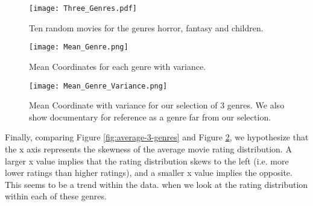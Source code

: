 \begin{figure}[hptb]
\centering
\texttt{[image: Three\_Genres.pdf]}
 \caption{Ten random movies for the genres horror, fantasy and children. }
\label{fig:tg}
\end{figure}

\begin{figure}[hptb]
\centering
\texttt{[image: Mean\_Genre.png]}
 \caption{Mean Coordinates for each genre with variance.}
\label{fig:tgMeanGenre}
\end{figure}

\begin{figure}[hptb]
\centering
\texttt{[image: Mean\_Genre\_Variance.png]}
 \caption{Mean Coordinate with variance for our selection of 3 genres. We also show documentary for reference as a genre far from our selection.}
\label{fig:tgMV}
\end{figure}

Finally, comparing Figure \ref{fig:average-3-genres} and Figure \ref{fig:tgMeanGenre}, we hypothesize that the x axis represents the skewness of the average movie rating distribution. A larger x value implies that the rating distribution skews to the left (i.e. more lower ratings than higher ratings), and a smaller x value implies the opposite. This seems to be a trend within the data. when we look at the rating distribution within each of these genres. 


